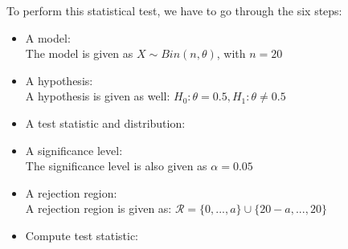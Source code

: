 To perform this statistical test, we have to go through the six steps:
\begin{itemize}
\item A model: \\
The model is given as $X \sim Bin(n,\theta)$, with $n = 20$
\item A hypothesis: \\
A hypothesis is given as well: $H_0: \theta = 0.5, H_1: \theta \neq 0.5$
\item A test statistic and distribution: \\
\item A significance level: \\
The significance level is also given as $\alpha = 0.05$
\item A rejection region: \\
A rejection region is given as: $\mathcal{R}=\{0,...,a\}\cup\{20-a,...,20\}$
\item Compute test statistic: \\
\end{itemize}